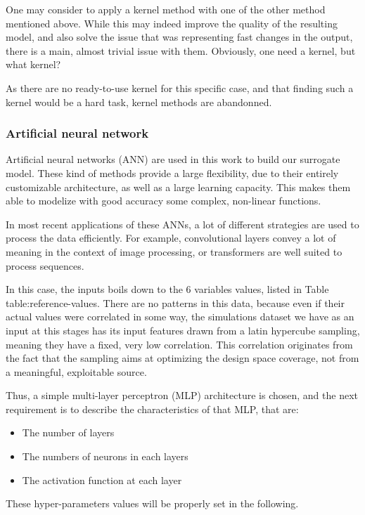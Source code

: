 One may consider to apply a kernel method with one of the other method mentioned above. While this may indeed improve the quality of the resulting model, and also solve the issue that was representing fast changes in the output, there is a main, almost trivial issue with them. Obviously, one need a kernel, but what kernel?

As there are no ready-to-use kernel for this specific case, and that finding such a kernel would be a hard task, kernel methods are abandonned.

\subsubsection{Artificial neural network}

Artificial neural networks (ANN) are used in this work to build our surrogate model. These kind of methods provide a large flexibility, due to their entirely customizable architecture, as well as a large learning capacity. This makes them able to modelize with good accuracy some complex, non-linear functions.

In most recent applications of these ANNs, a lot of different strategies are used to process the data efficiently. For example, convolutional layers convey a lot of meaning in the context of image processing, or transformers are well suited to process sequences\cite{deep-learning-class}.

In this case, the inputs boils down to the 6 variables values, listed in Table {table:reference-values}. There are no patterns in this data, because even if their actual values were correlated in some way, the simulations dataset we have as an input at this stages has its input features drawn from a latin hypercube sampling, meaning they have a fixed, very low correlation. This correlation originates from the fact that the sampling aims at optimizing the design space coverage, not from a meaningful, exploitable source.

Thus, a simple multi-layer perceptron (MLP) architecture is chosen, and the next requirement is to describe the characteristics of that MLP, that are:
\begin{itemize}
    \item The number of layers
    \item The numbers of neurons in each layers
    \item The activation function at each layer
\end{itemize}

These hyper-parameters values will be properly set in the following.

